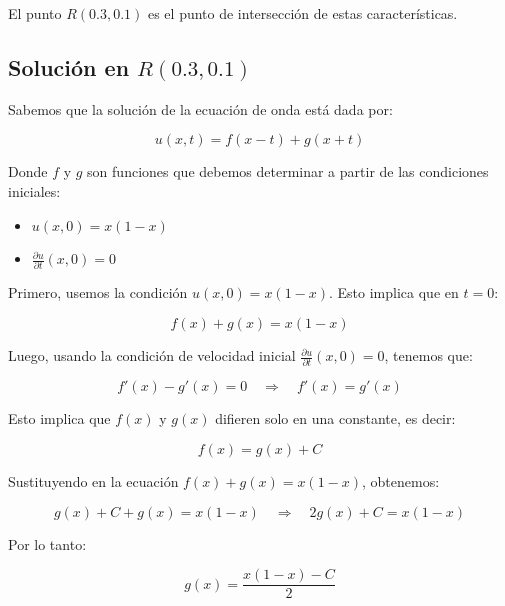 El punto \( R(0.3, 0.1) \) es el punto de intersección de estas características.

\subsection{Solución en \(R(0.3, 0.1)\)}

Sabemos que la solución de la ecuación de onda está dada por:

\begin{equation}
u(x,t) = f(x - t) + g(x + t)
\end{equation}

Donde \( f \) y \( g \) son funciones que debemos determinar a partir de las condiciones iniciales:

\begin{itemize}
    \item \( u(x, 0) = x(1 - x) \)
    \item \( \frac{\partial u}{\partial t}(x, 0) = 0 \)
\end{itemize}

Primero, usemos la condición \( u(x, 0) = x(1 - x) \). Esto implica que en \( t = 0 \):

\begin{equation}
f(x) + g(x) = x(1 - x)
\end{equation}

Luego, usando la condición de velocidad inicial \( \frac{\partial u}{\partial t}(x, 0) = 0 \), tenemos que:

\begin{equation}
f'(x) - g'(x) = 0 \quad \Rightarrow \quad f'(x) = g'(x)
\end{equation}

Esto implica que \( f(x) \) y \( g(x) \) difieren solo en una constante, es decir:

\begin{equation}
f(x) = g(x) + C
\end{equation}

Sustituyendo en la ecuación \( f(x) + g(x) = x(1 - x) \), obtenemos:

\begin{equation}
g(x) + C + g(x) = x(1 - x) \quad \Rightarrow \quad 2g(x) + C = x(1 - x)
\end{equation}

Por lo tanto:

\begin{equation}
g(x) = \frac{x(1 - x) - C}{2}
\end{equation}

